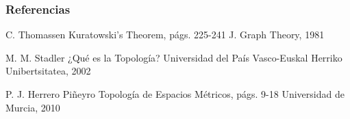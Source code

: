 \documentclass{beamer}
\begin{document}
\begin{frame}
\frametitle<presentation>{Referencias}
\begin{thebibliography}{10}
    \beamertemplatearticlebibitems
    
	C. Thomassen
	\newblock Kuratowski's Theorem, págs. 225-241
	\newblock J. Graph Theory, 1981
	
	M. M. Stadler
	\newblock ¿Qué es la Topología?
	\newblock Universidad del País Vasco-Euskal Herriko Unibertsitatea, 2002
	
	\beamertemplatebookbibitems
	
	P. J. Herrero Piñeyro
	\newblock Topología de Espacios Métricos, págs. 9-18
	\newblock Universidad de Murcia, 2010
	
\end{thebibliography}
\end{frame}
\end{document}
